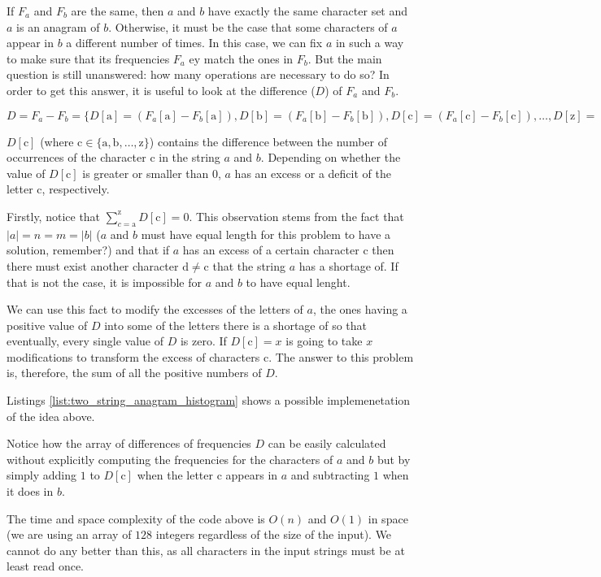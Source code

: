 If $F_a$ and $F_b$ are the same, then $a$ and $b$ have exactly the same character set and $a$ is an anagram of $b$.
Otherwise, it must be the case that some characters of $a$ appear in $b$ a different number of times.
In this case, we can fix $a$ in such a way to make sure that its frequencies $F_a$ ey match the ones in $F_b$. 
But the main question is still unanswered: how many operations are necessary to do so?  In order to get this answer, it is useful to look at
the difference ($D$) of $F_a$ and $F_b$.

$D = F_a - F_b = \{D[\mathrm{a}] = (F_a[\mathrm{a}] - F_b[\mathrm{a}]), D[\mathrm{b}] = (F_a[\mathrm{b}] - F_b[\mathrm{b}]), D[\mathrm{c}] = (F_a[\mathrm{c}] - F_b[\mathrm{c}]), \ldots, D[\mathrm{z}] = (F_a[\mathrm{z}] - F_b[\mathrm{z}])\}
$

$D[\mathrm{c}]$ (where $\mathrm{c} \in \{\mathrm{a},\mathrm{b},\ldots,\mathrm{z}\}$) contains the difference between the number of occurrences of the character $\mathrm{c}$ in the string $a$ and $b$. Depending on whether the value of $D[\mathrm{c}]$  is greater or smaller than $0$, $a$ has an excess or a deficit of the letter c, respectively.

Firstly, notice that $\sum_{c=\mathrm{a}}^{\mathrm{z}} D[\mathrm{c}] = 0$. This observation stems from the fact that $|a|=n=m=|b|$ ($a$ and $b$ must have equal length for this problem to have a solution, remember?) and that if $a$ has an excess of a certain character $\mathrm{c}$ then there must exist another character $\mathrm{d} \neq \mathrm{c}$ that the string $a$ has a shortage of. If that is not the case, it is impossible for $a$ and $b$ to have equal lenght.

We can use this fact to modify the excesses of the letters of $a$, the ones having a positive value of $D$ 
into some of the letters there is a shortage of so that eventually, every single value of $D$ is zero.
If $D[\mathrm{c}] = x$ is going to take $x$ modifications to transform the excess of characters $\mathrm{c}$.
The answer to this problem is, therefore, the sum of all the positive numbers of $D$. 

Listings \ref{list:two_string_anagram_histogram} shows a possible implemenetation of the idea above.




Notice how the array of differences of frequencies $D$ can be easily calculated without explicitly
computing the frequencies for the characters of $a$ and $b$ but by simply adding $1$ to $D[\mathrm{c}]$ when the letter $\mathrm{c}$ appears in $a$
and subtracting $1$ when it does in $b$. 

The time and space complexity of the code above is $O(n)$ and $O(1)$ in space (we are using an array of $128$ integers regardless of the size of the input). We cannot do any better than this, as all characters in the input strings must be at least read once.


